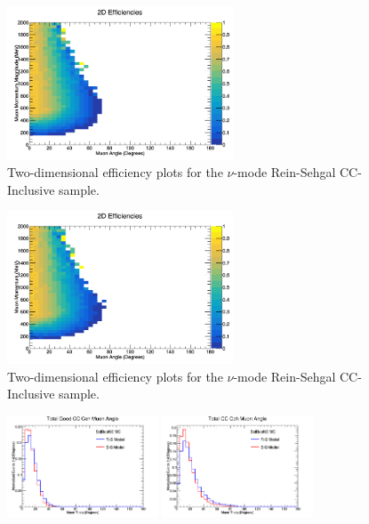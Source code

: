 \documentclass[11pt]{article}
\begin{document}
\begin{figure}[H]
\centering
\includegraphics[width=0.6\textwidth]{CCInclusivePlots/2DEffCompareANMRS.png}
\caption{Two-dimensional efficiency plots for the $\nu$-mode Rein-Sehgal CC-Inclusive sample.}
\end{figure}

\begin{figure}[H]
\centering
\includegraphics[width=0.6\textwidth]{CCInclusivePlots/2DEffCompareANMBS.png}
\caption{Two-dimensional efficiency plots for the $\nu$-mode Rein-Sehgal CC-Inclusive sample.}
\end{figure}

\begin{figure}[H]
\centering
\includegraphics[width=0.4\textwidth]{ANMCombinedPlotsImages/11-ANMCombinedPlots.png}
\includegraphics[width=0.4\textwidth]{ANMCombinedPlotsImages/13-ANMCombinedPlots.png}
\caption{}
\end{figure}
\end{document}
